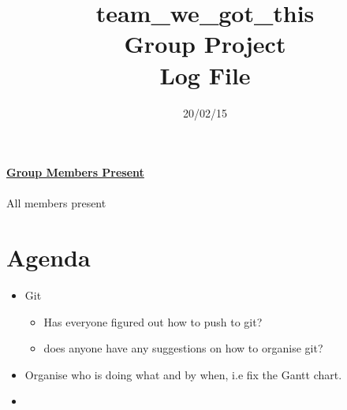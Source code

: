 \documentclass{article}
\begin{document}
	\title{team\_we\_got\_this\\ Group Project \\ Log File}
	
	\date{20/02/15}
	
	\maketitle
	


	{\bf\underline{Group Members Present}}\\\\
	All members present

	
	\section*{Agenda}
		\begin{itemize}
			\item Git
				\begin{itemize}
					\item Has everyone figured out how to push to git?
					\item does anyone have any suggestions on how to organise git?
				\end{itemize} 
			\item Organise who is doing what and by when, i.e fix the Gantt chart.
			\item 
		\end{itemize}
	
	
	
	
\end{document}
